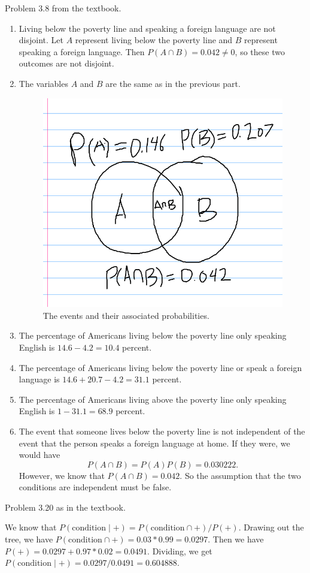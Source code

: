 \begin{prob}
    Problem 3.8 from the textbook.
\end{prob}
\begin{solution}
    \begin{enumerate}[label=(\alph*)]
    \setlength\itemsep{-.2em}
\item Living below the poverty line and speaking a foreign language are not disjoint. Let $A$ represent living below the poverty line and  $B$ represent speaking a foreign language. Then $P(A \cap B)=0.042\neq 0$, so these two outcomes are not disjoint.
\item The variables $A$ and $B$ are the same as in the previous part.
\begin{figure}[H]
\centering
 \includegraphics[width=0.4\linewidth]{hw_figures/hw1_poverty.png}
\caption{The events and their associated probabilities.}
\label{hw1_poverty}
\end{figure}
\item The percentage of Americans living below the poverty line only speaking English is $14.6-4.2=10.4$ percent.
\item The percentage of Americans living below the poverty line or speak a foreign language is $14.6+20.7-4.2=31.1$ percent.
\item The percentage of Americans living above the poverty line only speaking English is $1-31.1=68.9$ percent.
\item The event that someone lives below the poverty line is not independent of the event that the person speaks a foreign language at home. If they were, we would have \[
        P(A \cap B)=P(A)P(B)=0.030222.
    \] However, we know that $P(A \cap B)=0.042$. So the assumption that the two conditions are independent must be false.
    \end{enumerate}
\end{solution}

\begin{prob}
    Problem 3.20 as in the textbook.
\end{prob}
\begin{solution}
    We know that $P(\text{condition} \mid +)=P(\text{condition} \cap +)/P(+)$. Drawing out the tree, we have $P(\text{condition} \cap +)=0.03*0.99=0.0297.$ Then we have $P(+)=0.0297+0.97*0.02=0.0491$. Dividing, we get $P(\text{condition} \mid +)=0.0297/0.0491=0.604888$.
\end{solution}

